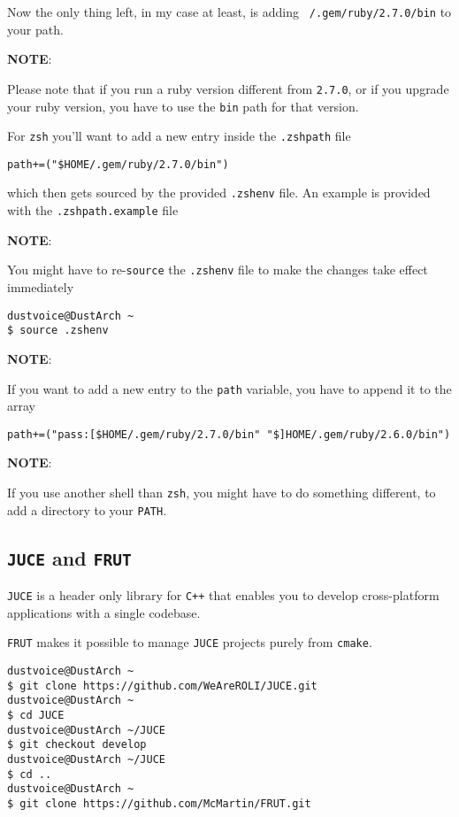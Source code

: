 \documentclass[9pt]{report}
\newcommand{\admonition}[2]{\textbf{#1}: {#2}}
\begin{document}
Now the only thing left, in my case at least, is adding \texttt{~/.gem/ruby/2.7.0/bin} to your path.


\admonition{NOTE}{Please note that if you run a ruby version different from \texttt{2.7.0}, or if you upgrade your ruby version, you have to use the \texttt{bin} path for that version.

}
For \texttt{zsh} you’ll want to add a new entry inside the \texttt{.zshpath} file


\begin{verbatim}
path+=("$HOME/.gem/ruby/2.7.0/bin")
\end{verbatim}

which then gets sourced by the provided \texttt{.zshenv} file.
An example is provided with the \texttt{.zshpath.example} file


\admonition{NOTE}{You might have to re-\texttt{source} the \texttt{.zshenv} file to make the changes take effect immediately


}
\begin{verbatim}
dustvoice@DustArch ~
$ source .zshenv
\end{verbatim}
\admonition{NOTE}{If you want to add a new entry to the \texttt{path} variable, you have to append it to the array


}
\begin{verbatim}
path+=("pass:[$HOME/.gem/ruby/2.7.0/bin" "$]HOME/.gem/ruby/2.6.0/bin")
\end{verbatim}
\admonition{NOTE}{If you use another shell than \texttt{zsh}, you might have to do something different, to add a directory to your \texttt{PATH}.

}

\vfill\eject

\hypertarget{x-juce-and-frut}{\subsection{\texttt{JUCE} and \texttt{FRUT}}}
\texttt{JUCE} is a header only library for \texttt{C++} that enables you to develop cross-platform applications with a single codebase.


\texttt{FRUT} makes it possible to manage \texttt{JUCE} projects purely from \texttt{cmake}.


\begin{verbatim}
dustvoice@DustArch ~
$ git clone https://github.com/WeAreROLI/JUCE.git
dustvoice@DustArch ~
$ cd JUCE
dustvoice@DustArch ~/JUCE
$ git checkout develop
dustvoice@DustArch ~/JUCE
$ cd ..
dustvoice@DustArch ~
$ git clone https://github.com/McMartin/FRUT.git
\end{verbatim}
\end{document}
